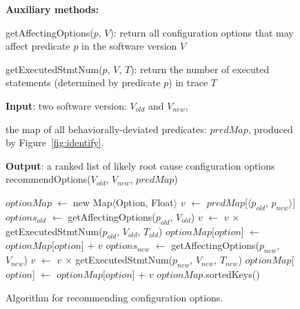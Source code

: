 
\begin{figure}[t]
\textbf{Auxiliary methods:}

\quad getAffectingOptions($\mathit{p}$, $\mathit{V}$): return all
configuration options that may affect predicate $\mathit{p}$ in the software version $\mathit{V}$

\quad getExecutedStmtNum($\mathit{p}$, $\mathit{V}$, $\mathit{T}$): return the number of executed statements (determined by predicate $\mathit{p}$) in trace $\mathit{T}$

\textbf{Input}: two software version: $\mathit{V_{old}}$ and $\mathit{V_{new}}$, 

\quad the map of all behaviorally-deviated predicates: $\mathit{predMap}$, produced by Figure~\ref{fig:identify}.

\textbf{Output}: {a ranked list of likely root cause configuration options}
\vspace{-4mm}%
recommendOptions($\mathit{V_{old}}$, $\mathit{V_{new}}$, $\mathit{predMap}$)\\
\begin{algorithmic}[1]
\STATE $\mathit{optionMap}$ $\leftarrow$ new Map$\langle$Option, Float$\rangle$
\STATE $\mathit{v}$ $\leftarrow$ $\mathit{predMap}$[$\langle$$\mathit{p_{old}}$, $\mathit{p_{new}}$$\rangle$]
\STATE $\mathit{options_{old}}$ $\leftarrow$ getAffectingOptions($\mathit{p_{old}}$, $\mathit{V_{old}}$)
\STATE $\mathit{v}$ $\leftarrow$ $\mathit{v}$ $\times$ getExecutedStmtNum($\mathit{p_{old}}$, $\mathit{V_{old}}$, $\mathit{T_{old}}$)
\STATE $\mathit{optionMap}$[$\mathit{option}$] $\leftarrow$ $\mathit{optionMap}$[$\mathit{option}$] + $\mathit{v}$
\ENDFOR
\ENDIF
{}
\STATE $\mathit{options_{new}}$ $\leftarrow$ getAffectingOptions($\mathit{p_{new}}$, $\mathit{V_{new}}$)
\STATE $\mathit{v}$ $\leftarrow$ $\mathit{v}$ $\times$ getExecutedStmtNum($\mathit{p_{new}}$, $\mathit{V_{new}}$, $\mathit{T_{new}}$)
\STATE $\mathit{optionMap}$[$\mathit{option}$] $\leftarrow$ $\mathit{optionMap}$[$\mathit{option}$] + $\mathit{v}$
\ENDFOR
\ENDIF
\ENDFOR
\RETURN $\mathit{optionMap}$.sortedKeys()
\vspace{-2mm}
\end{algorithmic}
\caption{Algorithm for recommending configuration options.
\label{fig:recommend}
}


\end{figure}
